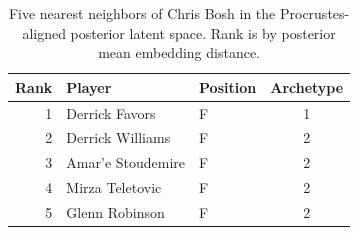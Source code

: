 \begin{table}[htbp]
  \centering\small
  \begin{tabular}{rllc}
    \toprule
    Rank & Player & Position & Archetype \\
    \midrule
    1 & Derrick Favors & F & 1 \\
    2 & Derrick Williams & F & 2 \\
    3 & Amar'e Stoudemire & F & 2 \\
    4 & Mirza Teletovic & F & 2 \\
    5 & Glenn Robinson & F & 2 \\
    \bottomrule
  \end{tabular}
  \caption{Five nearest neighbors of Chris Bosh in the Procrustes-aligned posterior latent space. Rank is by posterior mean embedding distance.}
  \label{tab:Chris_Bosh_neighbors}
\end{table}

